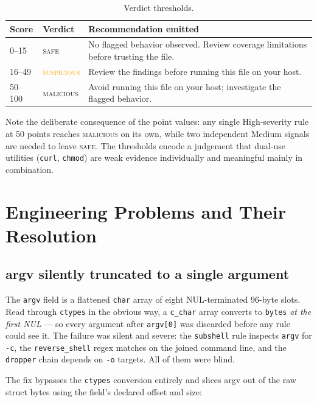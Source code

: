 \documentclass[11pt,a4paper]{article}
\newcommand{\code}[1]{\texttt{\small #1}}
\begin{document}
\begin{table}[H]
\centering\footnotesize
\begin{tabular}{@{}llp{70mm}@{}}
\toprule
\textbf{Score} & \textbf{Verdict} & \textbf{Recommendation emitted} \\
\midrule
0--15   & \textcolor{boxsafe}{\textsc{safe}} &
  No flagged behavior observed. Review coverage limitations before trusting the
  file. \\
16--49  & \textcolor{orange}{\textsc{suspicious}} &
  Review the findings before running this file on your host. \\
50--100 & \textcolor{boxbad}{\textsc{malicious}} &
  Avoid running this file on your host; investigate the flagged behavior. \\
\bottomrule
\end{tabular}
\caption{Verdict thresholds.}
\end{table}

\noindent
Note the deliberate consequence of the point values: any single High-severity rule
at 50 points reaches \textsc{malicious} on its own, while two independent Medium
signals are needed to leave \textsc{safe}. The thresholds encode a judgement that
dual-use utilities (\code{curl}, \code{chmod}) are weak evidence individually and
meaningful mainly in combination.

\section{Engineering Problems and Their Resolution}

\subsection{argv silently truncated to a single argument}
\label{sec:argvfix}
The \code{argv} field is a flattened \code{char} array of eight NUL-terminated
96-byte slots. Read through \code{ctypes} in the obvious way, a \code{c\_char} array
converts to \code{bytes} \emph{at the first NUL} --- so every argument after
\code{argv[0]} was discarded before any rule could see it. The failure was silent
and severe: the \code{subshell} rule inspects \code{argv} for \code{-c}, the
\code{reverse\_shell} regex matches on the joined command line, and the
\code{dropper} chain depends on \code{-o} targets. All of them were blind.

The fix bypasses the \code{ctypes} conversion entirely and slices argv out of the
raw struct bytes using the field's declared offset and size:
\end{document}
